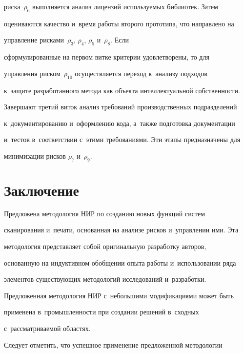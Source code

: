 рис\-ка~$\rho_6$ выполняется анализ лицензий ис\-поль\-зу\-емых биб\-лио\-тек. Затем 


оцениваются качество и~время работы второго прототипа, что на\-прав\-ле\-но на 


управ\-ле\-ние рис\-ка\-ми~$\rho_3$, $\rho_4$, $\rho_5$ и~$\rho_8$. Если 


сформулированные на первом вит\-ке критерии удовле\-тво\-ре\-ны, то для 


управ\-ле\-ния риском~$\rho_{10}$ осуществляется переход к~анализу подходов 


к~защите раз\-ра\-бо\-тан\-но\-го метода как объекта интеллектуальной соб\-ст\-вен\-ности. 


Завершают третий виток анализ требований производственных подразделений 


к~документированию и~оформлению кода, а~так\-же под\-го\-тов\-ка документации 


и~тес\-тов в~соответствии с~этими требованиями. Эти этапы пред\-на\-зна\-че\-ны для 


минимизации рисков $\rho_7$ и~$\rho_9$. 





\section{Заключение}


  


  Предложена методология НИР по созданию новых функций сис\-тем 


сканирования и~печати, основанная на анализе рис\-ков и~управ\-ле\-нии ими. Эта 


методология пред\-став\-ля\-ет собой оригинальную раз\-ра\-бот\-ку авторов, 


основанную на индуктивном обобщении опыта работы и~использовании ряда 


элементов су\-ще\-ст\-ву\-ющих методологий исследований и~раз\-ра\-бот\-ки. 


Предложенная методология НИР с~небольшими модификациями может быть 


применена в~про\-мыш\-лен\-ности при создании решений в~сходных 


с~рас\-смат\-ри\-ва\-емой областях.


  


  Следует отметить, что успешное применение предложенной методологии 


